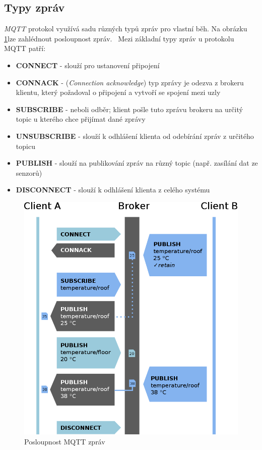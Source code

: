 \subsection*{Typy zpráv}
\emph{MQTT} protokol využívá sadu různých typů zpráv pro vlastní běh. Na obrázku \ref{figure:mqtt_flow}lze zahlédnout posloupnost zpráv.~\cite{wiki:mqtt_broker}
Mezi základní typy zpráv u protokolu MQTT patří:
\begin{itemize}
  \item \textbf{CONNECT} - slouží pro ustanovení připojení
  \item \textbf{CONNACK} - (\emph{Connection acknowledge}) typ zprávy je odezva z brokeru klientu, který požadoval o připojení a vytvoří se spojení mezi uzly
  \item \textbf{SUBSCRIBE} - neboli odběr; klient pošle tuto zprávu brokeru na určitý topic u kterého chce přijímat dané zprávy
  \item \textbf{UNSUBSCRIBE} - slouží k odhlášení klienta od odebírání zpráv z určitého topicu
  \item \textbf{PUBLISH} - slouží na publikování zpráv na různý topic (např. zasílání dat ze senzorů)
  \item \textbf{DISCONNECT} - slouží k odhlášení klienta z celého systému
\end{itemize}

\begin{figure}[ht]
  \centering
  \includegraphics[width=.7 \linewidth]{obrazky-figures/mqtt_flow.png}
  \caption{Posloupnost MQTT zpráv}
  \label{figure:mqtt_flow}
\end{figure}

